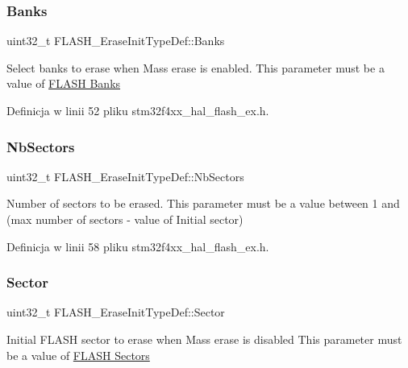\subsubsection{\texorpdfstring{Banks}{Banks}}
{\footnotesize\ttfamily uint32\+\_\+t F\+L\+A\+S\+H\+\_\+\+Erase\+Init\+Type\+Def\+::\+Banks}

Select banks to erase when Mass erase is enabled. This parameter must be a value of \hyperlink{group___f_l_a_s_h_ex___banks}{F\+L\+A\+SH Banks} 

Definicja w linii 52 pliku stm32f4xx\+\_\+hal\+\_\+flash\+\_\+ex.\+h.

\mbox{\label{struct_f_l_a_s_h___erase_init_type_def_aec98fec1676cd618e3743158c855a76a}} 
\subsubsection{\texorpdfstring{Nb\+Sectors}{NbSectors}}
{\footnotesize\ttfamily uint32\+\_\+t F\+L\+A\+S\+H\+\_\+\+Erase\+Init\+Type\+Def\+::\+Nb\+Sectors}

Number of sectors to be erased. This parameter must be a value between 1 and (max number of sectors -\/ value of Initial sector) 

Definicja w linii 58 pliku stm32f4xx\+\_\+hal\+\_\+flash\+\_\+ex.\+h.

\mbox{\label{struct_f_l_a_s_h___erase_init_type_def_a13bac8f9a1ba504a265b44345ecf4d2b}} 
\subsubsection{\texorpdfstring{Sector}{Sector}}
{\footnotesize\ttfamily uint32\+\_\+t F\+L\+A\+S\+H\+\_\+\+Erase\+Init\+Type\+Def\+::\+Sector}

Initial F\+L\+A\+SH sector to erase when Mass erase is disabled This parameter must be a value of \hyperlink{group___f_l_a_s_h_ex___sectors}{F\+L\+A\+SH Sectors} 

